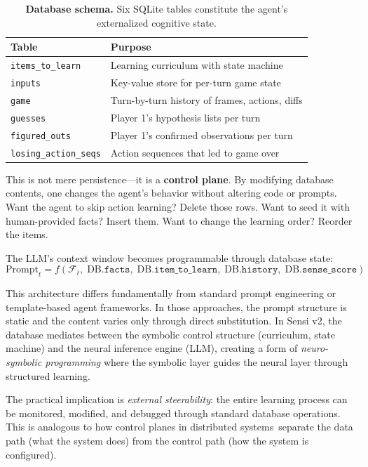 \documentclass[11pt,letterpaper]{article}
\begin{document}
\begin{table}[t]
  \centering
  \caption{\textbf{Database schema.} Six SQLite tables constitute the agent's externalized cognitive state.}
  \label{tab:schema}
  \begin{tabular}{ll}
    \toprule
    \textbf{Table} & \textbf{Purpose} \\
    \midrule
    \texttt{items\_to\_learn} & Learning curriculum with state machine \\
    \texttt{inputs} & Key-value store for per-turn game state \\
    \texttt{game} & Turn-by-turn history of frames, actions, diffs \\
    \texttt{guesses} & Player 1's hypothesis lists per turn \\
    \texttt{figured\_outs} & Player 1's confirmed observations per turn \\
    \texttt{losing\_action\_seqs} & Action sequences that led to game over \\
    \bottomrule
  \end{tabular}
\end{table}

This is not mere persistence---it is a \textbf{control plane}. By modifying database contents, one changes the agent's behavior without altering code or prompts. Want the agent to skip action learning? Delete those rows. Want to seed it with human-provided facts? Insert them. Want to change the learning order? Reorder the items.

The LLM's context window becomes programmable through database state:
\begin{equation}
  \text{Prompt}_t = f\!\left(\mathcal{F}_t,\; \text{DB}.\texttt{facts},\; \text{DB}.\texttt{item\_to\_learn},\; \text{DB}.\texttt{history},\; \text{DB}.\texttt{sense\_score}\right)
  \label{eq:prompt}
\end{equation}

This architecture differs fundamentally from standard prompt engineering or template-based agent frameworks. In those approaches, the prompt structure is static and the content varies only through direct substitution. In Sensi v2, the database mediates between the symbolic control structure (curriculum, state machine) and the neural inference engine (LLM), creating a form of \emph{neuro-symbolic programming} where the symbolic layer guides the neural layer through structured learning.

The practical implication is \emph{external steerability}: the entire learning process can be monitored, modified, and debugged through standard database operations. This is analogous to how control planes in distributed systems~separate the data path (what the system does) from the control path (how the system is configured).
\end{document}
